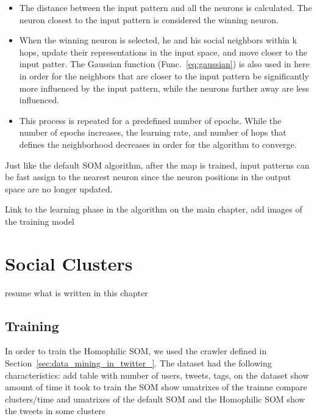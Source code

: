 \begin{itemize}
  \item The distance between the input pattern and all the neurons is calculated. The neuron closest to the input pattern is considered the winning neuron.
  \item When the winning neuron is selected, he and his social neighbors within k hops, update their representations in the input space, and move closer to the input patter. The Gaussian function (Func.~\ref{eq:gaussian}) is also used in here in order for the neighbors that are closer to the input pattern be significantly more influenced by the input pattern, while the neurons further away are less influenced. 
  \item This process is repeated for a predefined number of epochs. While the number of epochs increases, the learning rate, and number of hops that defines the neighborhood decreases in order for the algorithm to converge.
\end{itemize}

Just like the default \ac{SOM} algorithm, after the map is trained, input patterns can be fast assign to the nearest neuron since the neuron positions in the output space are no longer updated.

{\color{red} Link to the learning phase in the algorithm on the main chapter, add images of the training model }

\section{Social Clusters}
\label{sec:hmophilic_som_clusters}
{\color{red} resume what is written in this chapter }

\subsection{Training}
\label{sub:dataset}
In order to train the Homophilic SOM, we used the crawler defined in Section~\ref{sec:data_mining_in_twitter_}. The dataset had the following characteristics:
{\color{red} add table with number of users, tweets, tags, on the dataset}
{\color{red} show amount of time it took to train the SOM}
{\color{red} show umatrixes of the trainne }
{\color{red} compare clusters/time and umatrixes of the default SOM and the Homophilic SOM}
{\color{red} show the tweets in some clusters }


